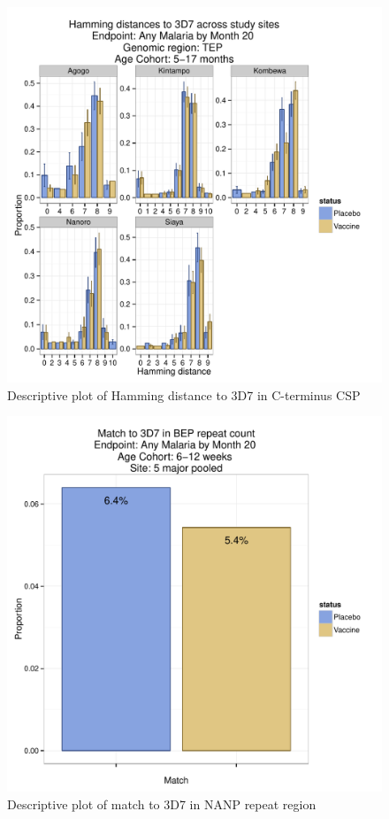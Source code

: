 \documentclass[]{article}
\begin{document}
\begin{figure}[htbp]
\centering
\includegraphics{figures/hamming-infant-sites-x-1.pdf}
\caption{Descriptive plot of Hamming distance to 3D7 in C-terminus CSP}
\end{figure}

\begin{figure}[htbp]
\centering
\includegraphics{figures/bep-match-newborn-x-1.pdf}
\caption{Descriptive plot of match to 3D7 in NANP repeat region}
\end{figure}
\end{document}
